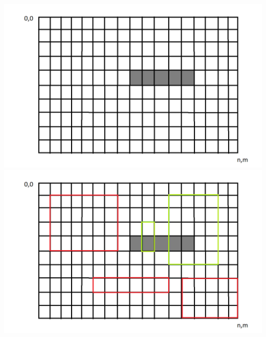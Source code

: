 \documentclass[11pt]{article}
\begin{document}
\begin{qunlist}
\includegraphics[width=\textwidth]{rod.png}
\includegraphics[width=\textwidth]{query.png}


\end{qunlist}
\end{document}
